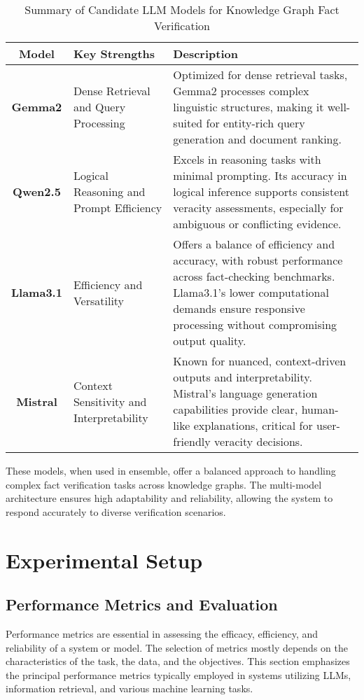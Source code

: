 \begin{table}[h!]
    \centering
    \begin{tabular}{c|p{4cm}|p{8cm}}
        \toprule
        \textbf{Model} & \textbf{Key Strengths} & \textbf{Description} \\
        \midrule
        \textbf{Gemma2} & Dense Retrieval and Query Processing & Optimized for dense retrieval tasks, Gemma2 processes complex linguistic structures, making it well-suited for entity-rich query generation and document ranking. \\
        \hline
        \textbf{Qwen2.5} & Logical Reasoning and Prompt Efficiency & Excels in reasoning tasks with minimal prompting. Its accuracy in logical inference supports consistent veracity assessments, especially for ambiguous or conflicting evidence. \\
        \hline
        \textbf{Llama3.1} & Efficiency and Versatility & Offers a balance of efficiency and accuracy, with robust performance across fact-checking benchmarks. Llama3.1's lower computational demands ensure responsive processing without compromising output quality. \\
        \hline
        \textbf{Mistral} & Context Sensitivity and Interpretability & Known for nuanced, context-driven outputs and interpretability. Mistral’s language generation capabilities provide clear, human-like explanations, critical for user-friendly veracity decisions. \\
        \bottomrule
    \end{tabular}
    \caption{Summary of Candidate LLM Models for Knowledge Graph Fact Verification}
    \label{tab:candidate_models}
\end{table}

These models, when used in ensemble, offer a balanced approach to handling complex fact verification tasks across knowledge graphs.
The multi-model architecture ensures high adaptability and reliability, allowing the system to respond accurately to diverse verification scenarios.

\section{Experimental Setup}\label{sec:empirical-evaluation:experimental-setup}
\subsection{Performance Metrics and Evaluation}\label{subsec:empirical-evaluation:experimental-setup:performance-metrics-and-evaluation}
Performance metrics are essential in assessing the efficacy, efficiency, and reliability of a system or model.
The selection of metrics mostly depends on the characteristics of the task, the data, and the objectives.
This section emphasizes the principal performance metrics typically employed in systems utilizing LLMs, information retrieval, and various machine learning tasks.
